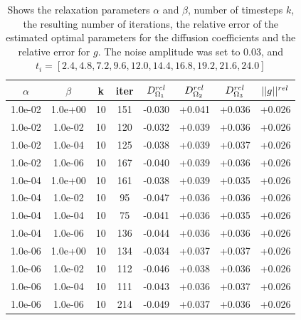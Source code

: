 \documentclass[12pt,a4paper]{article}
\begin{document}
\begin{table}
\centering
\caption{Shows the relaxation parameters $\alpha$ and $\beta$, number of timesteps $k$, the resulting number of iterations, the relative error of the estimated optimal parameters for the diffusion coefficients and the relative error for $g$. The noise amplitude was set to 0.03, and $ t_i=[2.4, 4.8, 7.2, 9.6, 12.0, 14.4, 16.8, 19.2, 21.6, 24.0]$ }
\begin{tabular}{*{8}c}
$\alpha$ & $\beta$ & k  & iter & $ D_{\Omega_1}\sp{rel} $ & $D_{\Omega_2}\sp{rel}$ & $D_{\Omega_3}\sp{rel}$ & $||g||\sp{rel} $\\
\hline
 1.0e-02 	 & 1.0e+00 	 & 10 & 151 	 & -0.030 & +0.041 & +0.036 & +0.026 \\ 
 1.0e-02 	 & 1.0e-02 	 & 10 & 120 	 & -0.032 & +0.039 & +0.036 & +0.026 \\ 
 1.0e-02 	 & 1.0e-04 	 & 10 & 125 	 & -0.038 & +0.039 & +0.037 & +0.026 \\ 
 1.0e-02 	 & 1.0e-06 	 & 10 & 167 	 & -0.040 & +0.039 & +0.036 & +0.026 \\ 
 1.0e-04 	 & 1.0e+00 	 & 10 & 161 	 & -0.038 & +0.039 & +0.035 & +0.026 \\ 
 1.0e-04 	 & 1.0e-02 	 & 10 & 95 	 & -0.047 & +0.036 & +0.036 & +0.026 \\ 
 1.0e-04 	 & 1.0e-04 	 & 10 & 75 	 & -0.041 & +0.036 & +0.035 & +0.026 \\ 
 1.0e-04 	 & 1.0e-06 	 & 10 & 136 	 & -0.044 & +0.036 & +0.036 & +0.026 \\ 
 1.0e-06 	 & 1.0e+00 	 & 10 & 134 	 & -0.034 & +0.037 & +0.037 & +0.026 \\ 
 1.0e-06 	 & 1.0e-02 	 & 10 & 112 	 & -0.046 & +0.038 & +0.036 & +0.026 \\ 
 1.0e-06 	 & 1.0e-04 	 & 10 & 111 	 & -0.043 & +0.036 & +0.037 & +0.026 \\ 
 1.0e-06 	 & 1.0e-06 	 & 10 & 214 	 & -0.049 & +0.037 & +0.036 & +0.026 \\
  

\end{tabular}
\end{table}
\end{document}
